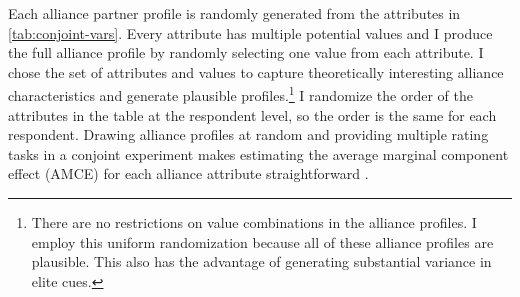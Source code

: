 \documentclass[12pt]{article}
\begin{document}
Each alliance partner profile is randomly generated from the attributes in \autoref{tab:conjoint-vars}.
Every attribute has multiple potential values and I produce the full alliance profile by randomly selecting one value from each attribute. 
I chose the set of attributes and values to capture theoretically interesting alliance characteristics and generate plausible profiles.\footnote{There are no restrictions on value combinations in the alliance profiles. I employ this uniform randomization because all of these alliance profiles are plausible. This also has the advantage of generating substantial variance in elite cues.} %
I randomize the order of the attributes in the table at the respondent level, so the order is the same for each respondent. 
Drawing alliance profiles at random and providing multiple rating tasks in a conjoint experiment makes estimating the average marginal component effect (AMCE) for each alliance attribute straightforward \citep{Hainmuelleretal2014}. 
\end{document}
